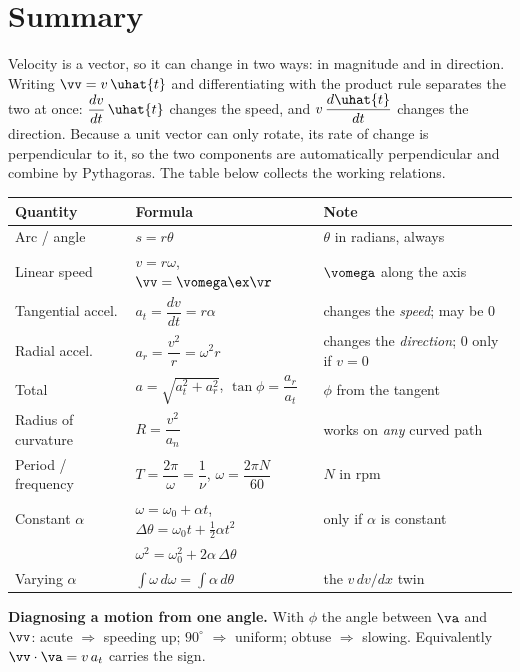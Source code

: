 \section{Summary}\label{sec:summary6}
Velocity is a vector, so it can change in two ways: in magnitude and in direction. Writing $\vv=v\,\uhat{t}$ and differentiating with the product rule separates the two at once:
$\dfrac{dv}{dt}\,\uhat{t}$ changes the speed, and $v\,\dfrac{d\uhat{t}}{dt}$ changes the direction. Because a unit vector can only rotate,
its rate of change is perpendicular to it, so the two components are automatically perpendicular and
combine by Pythagoras. The table below collects the working relations.

\medskip
{\small\renewcommand{\arraystretch}{1.45}
\begin{center}
\begin{tabular}{@{}lll@{}}
\toprule
Quantity & Formula & Note\\
\midrule
Arc / angle        & $s=r\theta$                                   & $\theta$ in radians, always\\
Linear speed       & $v=r\omega$, \; $\vv=\vomega\ex\vr$           & $\vomega$ along the axis\\
Tangential accel.  & $a_t=\dfrac{dv}{dt}=r\alpha$                  & changes the \emph{speed}; may be $0$\\
Radial accel.      & $a_r=\dfrac{v^{2}}{r}=\omega^{2}r$            & changes the \emph{direction}; $0$ only if $v=0$\\
Total              & $a=\sqrt{a_t^{2}+a_r^{2}}$, \; $\tan\phi=\dfrac{a_r}{a_t}$ & $\phi$ from the tangent\\
Radius of curvature& $R=\dfrac{v^{2}}{a_n}$                        & works on \emph{any} curved path\\
Period / frequency & $T=\dfrac{2\pi}{\omega}=\dfrac1\nu$, \; $\omega=\dfrac{2\pi N}{60}$ & $N$ in rpm\\
Constant $\alpha$  & $\omega=\omega_0+\alpha t$,\; $\Delta\theta=\omega_0t+\tfrac12\alpha t^{2}$ & only if $\alpha$ is constant\\
                   & $\omega^{2}=\omega_0^{2}+2\alpha\,\Delta\theta$ & \\
Varying $\alpha$   & $\displaystyle\int\omega\,d\omega=\int\alpha\,d\theta$ & the $v\,dv/dx$ twin\\
\bottomrule
\end{tabular}
\end{center}
}

\medskip
\textbf{Diagnosing a motion from one angle.} With $\phi$ the angle between $\va$ and $\vv$:
acute $\Rightarrow$ speeding up; $90^\circ$ $\Rightarrow$ uniform; obtuse $\Rightarrow$ slowing.
Equivalently $\vv\cdot\va=v\,a_t$ carries the sign.

